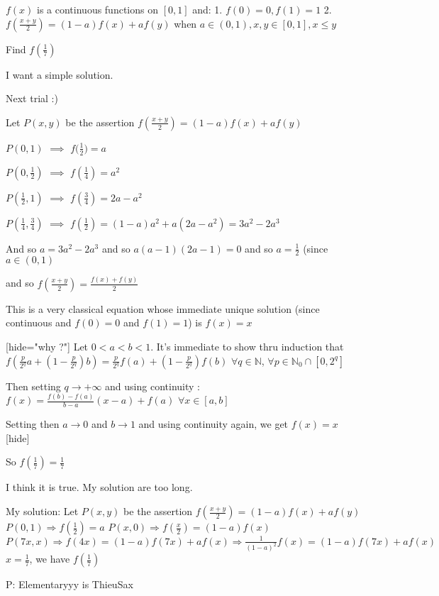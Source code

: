 \begin{solution}
	\begin{tcolorbox}$ f(x)$ is a continuous functions on $ [0,1]$ and:
1. $ f(0) = 0 , f(1) = 1$
2. $ f(\frac {x + y}{2}) = (1 - a)f(x) + af(y)$ when $ a\in (0,1), x,y\in [0,1] , x\leq y$

Find $ f(\frac {1}{7})$

I want a simple solution.\end{tcolorbox}

Next trial :)

Let $ P(x,y)$ be the assertion $ f(\frac{x+y}2)=(1-a)f(x)+af(y)$

$ P(0,1)$ $ \implies$ ${ f(\frac 12})=a$

$ P(0,\frac 12)$ $ \implies$ $ f(\frac 14)=a^2$

$ P(\frac 12,1)$ $ \implies$ $ f(\frac 34)=2a-a^2$

$ P(\frac 14,\frac 34)$ $ \implies$ $ f(\frac 12)=(1-a)a^2+a(2a-a^2)=3a^2-2a^3$

And so $ a=3a^2-2a^3$ and so $ a(a-1)(2a-1)=0$ and so $ a=\frac 12$ (since $ a\in(0,1)$

and so $ f(\frac {x + y}2) = \frac {f(x) + f(y)}2$

This is a very classical equation whose immediate unique solution (since continuous and $ f(0) = 0$ and $ f(1) = 1$) is $ f(x) = x$ 

[hide="why ?"]
Let $ 0 < a < b < 1$. It's immediate to show thru induction that $ f(\frac p{2^q}a + (1 - \frac p{2^q})b) = \frac p{2^q}f(a) + (1 - \frac p{2^q})f(b)$ $ \forall q\in\mathbb N$, $ \forall p\in\mathbb N_0\cap[0,2^q]$

Then setting $ q\to + \infty$ and using continuity : $ f(x) = \frac {f(b) - f(a)}{b - a}(x - a) + f(a)$ $ \forall x\in[a,b]$

Setting then $ a\to 0$ and $ b\to 1$ and using continuity again, we get $ f(x) = x$
[\/hide]

So $ f(\frac 17) = \frac 17$
\end{solution}



\begin{solution}
	I think it is true.
My solution are too long.
\end{solution}



\begin{solution}
	My solution:
Let $ P(x,y)$ be the assertion $ f(\frac {x + y}2) = (1 - a)f(x) + af(y)$
$ P(0, 1)\Rightarrow f(\frac {1}{2}) = a$
$ P(x, 0)\Rightarrow f(\frac {x}{2}) = (1 - a)f(x)$
$ P(7x, x)\Rightarrow f(4x) = (1 - a)f(7x) + af(x)\Rightarrow \frac {1}{(1 - a)^2}f(x) = (1 - a)f(7x) + af(x)$
$ x = \frac{1}{7}$, we have $ f(\frac {1}{7})$

P\s: Elementaryyy is ThieuSax
\end{solution}



